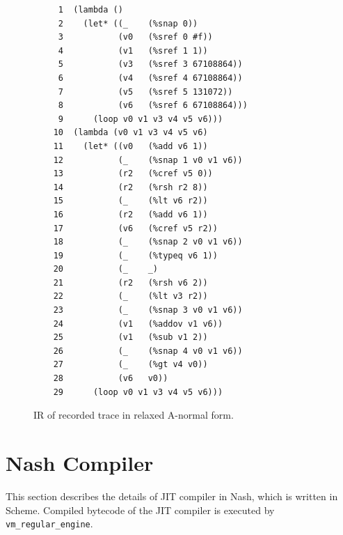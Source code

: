 \documentclass[preprint, 10pt]{sigplanconf}
\begin{document}

\begin{figure}
  \centering
  \small
\begin{verbatim}
     1	(lambda ()
     2    (let* ((_    (%snap 0))
     3           (v0   (%sref 0 #f))
     4           (v1   (%sref 1 1))
     5           (v3   (%sref 3 67108864))
     6           (v4   (%sref 4 67108864))
     7           (v5   (%sref 5 131072))
     8           (v6   (%sref 6 67108864)))
     9      (loop v0 v1 v3 v4 v5 v6)))
    10	(lambda (v0 v1 v3 v4 v5 v6)
    11    (let* ((v0   (%add v6 1))
    12           (_    (%snap 1 v0 v1 v6))
    13           (r2   (%cref v5 0))
    14           (r2   (%rsh r2 8))
    15           (_    (%lt v6 r2))
    16           (r2   (%add v6 1))
    17           (v6   (%cref v5 r2))
    18           (_    (%snap 2 v0 v1 v6))
    19           (_    (%typeq v6 1))
    20           (_    _)
    21           (r2   (%rsh v6 2))
    22           (_    (%lt v3 r2))
    23           (_    (%snap 3 v0 v1 v6))
    24           (v1   (%addov v1 v6))
    25           (v1   (%sub v1 2))
    26           (_    (%snap 4 v0 v1 v6))
    27           (_    (%gt v4 v0))
    28           (v6   v0))
    29      (loop v0 v1 v3 v4 v5 v6)))
\end{verbatim}
\caption{IR of recorded trace in relaxed A-normal form.}
\label{fig:anf}
\end{figure}

\section{Nash Compiler}
\label{sec:compiler}

This section describes the details of JIT compiler in Nash, which is written
in Scheme. Compiled bytecode of the JIT compiler is executed by
\texttt{vm\_regular\_engine}.
\end{document}
